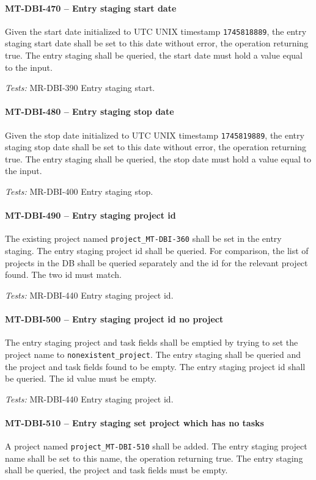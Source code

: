 \paragraph{MT-DBI-470 -- Entry staging start date}
Given the start date initialized to UTC UNIX timestamp
\lstinline{1745818889}, the entry staging start date shall be
set to this date without error, the operation returning true.
The entry staging shall be queried, the start date must hold
a value equal to the input.

\textit{Tests: } MR-DBI-390 Entry staging start.

\paragraph{MT-DBI-480 -- Entry staging stop date}
Given the stop date initialized to UTC UNIX timestamp
\lstinline{1745819889}, the entry staging stop date shall be
set to this date without error, the operation returning true.
The entry staging shall be queried, the stop date must hold
a value equal to the input.

\textit{Tests: } MR-DBI-400 Entry staging stop.

\paragraph{MT-DBI-490 -- Entry staging project id}
The existing project named \lstinline{project_MT-DBI-360} shall
be set in the entry staging.
The entry staging project id shall be queried.
For comparison, the list of projects in the DB shall be queried
separately and the id for the relevant project found.
The two id must match.

\textit{Tests: } MR-DBI-440 Entry staging project id.

\paragraph{MT-DBI-500 -- Entry staging project id no project}
The entry staging project and task fields shall be emptied
by trying to set the project name to \lstinline{nonexistent_project}.
The entry staging shall be queried and the project and task fields found
to be empty.
The entry staging project id shall be queried. The id value must be
empty.

\textit{Tests: } MR-DBI-440 Entry staging project id.

\paragraph{MT-DBI-510 -- Entry staging set project which has no tasks}
A project named \lstinline{project_MT-DBI-510} shall be added.
The entry staging project name shall be set to this name, the operation
returning true.
The entry staging shall be queried, the project and task fields must
be empty.

